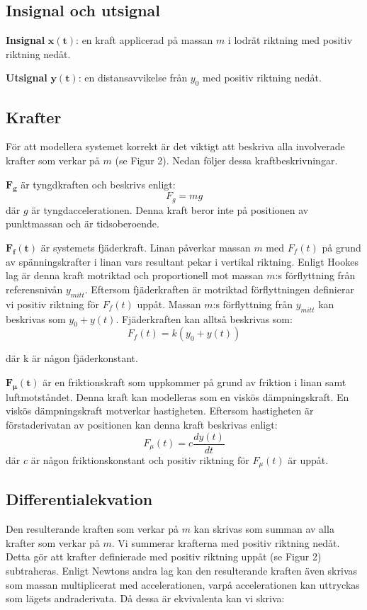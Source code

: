 \subsection{Insignal och utsignal}
\textbf{Insignal} $\bm{x(t)}$:
en kraft applicerad på massan $m$ i lodrät riktning med positiv riktning nedåt.

\textbf{Utsignal} $\bm{y(t)}$:
en distansavvikelse från $y_0$ med positiv riktning nedåt.

\subsection{Krafter}
För att modellera systemet korrekt är det viktigt att beskriva alla involverade krafter som verkar på $m$ (se Figur 2). Nedan följer dessa kraftbeskrivningar.

$\bm{F_g}$ är tyngdkraften och beskrivs enligt: 
$$F_g=mg$$
där $g$ är tyngdaccelerationen. Denna kraft beror inte på positionen av punktmassan och är tidsoberoende.

$\bm{F_f(t)}$ är systemets fjäderkraft. Linan påverkar massan $m$ med $F_f(t)$ på grund av spänningskrafter i linan vars resultant pekar i vertikal riktning. Enligt Hookes lag är denna kraft motriktad och proportionell mot massan $m$:s förflyttning från referensnivån $y_{mitt}$. Eftersom fjäderkraften är motriktad förflyttningen definierar vi positiv riktning för $F_f(t)$ uppåt. Massan $m$:s förflyttning från $y_{mitt}$ kan beskrivas som $y_0+y(t)$. Fjäderkraften kan alltså beskrivas som: $$F_f(t) = k(y_0+y(t))$$

där k är någon fjäderkonstant.

$\bm{F_\mu(t)}$ är en friktionskraft som uppkommer på grund av friktion i linan samt luftmotståndet. Denna kraft kan modelleras som en viskös dämpningskraft. En viskös dämpningskraft motverkar hastigheten. Eftersom hastigheten är förstaderivatan av positionen kan denna kraft beskrivas enligt: 
$$F_\mu(t) = c\frac{dy(t)}{dt}$$
där $c$ är någon friktionskonstant och positiv riktning för $F_\mu(t)$ är uppåt.

\subsection{Differentialekvation}
Den resulterande kraften som verkar på $m$ kan skrivas som summan av alla krafter som verkar på $m$. Vi summerar krafterna med positiv riktning nedåt. Detta gör att krafter definierade med positiv riktning uppåt (se Figur 2) subtraheras. Enligt Newtons andra lag kan den resulterande kraften även skrivas som massan multiplicerat med accelerationen, varpå accelerationen kan uttryckas som lägets andraderivata. Då dessa är ekvivalenta kan vi skriva:

